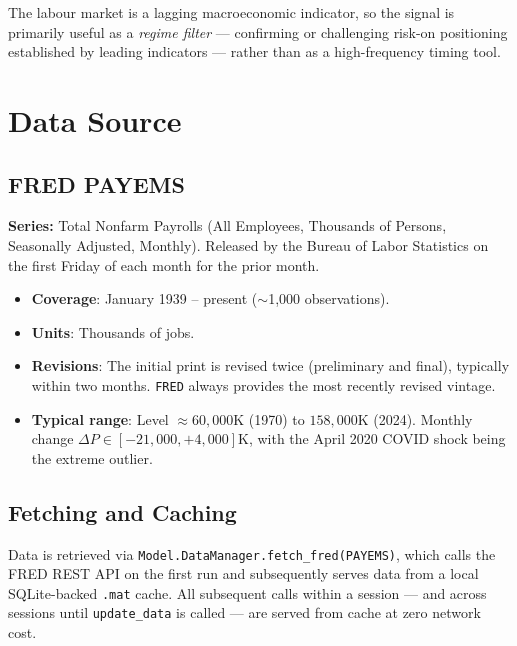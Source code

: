 \documentclass[11pt, a4paper]{article}
\newcommand{\dP}{\Delta P}
\begin{document}
The labour market is a lagging macroeconomic indicator, so the signal
is primarily useful as a \emph{regime filter} — confirming or
challenging risk-on positioning established by leading indicators —
rather than as a high-frequency timing tool.

\section{Data Source}
\label{sec:data}

\subsection{FRED PAYEMS}

\textbf{Series:} Total Nonfarm Payrolls (All Employees, Thousands of
Persons, Seasonally Adjusted, Monthly). Released by the Bureau of
Labor Statistics on the first Friday of each month for the prior month.

\begin{itemize}[leftmargin=2em]
  \item \textbf{Coverage}: January 1939 -- present ($\sim$1{,}000 observations).
  \item \textbf{Units}: Thousands of jobs.
  \item \textbf{Revisions}: The initial print is revised twice (preliminary
        and final), typically within two months. \texttt{FRED} always
        provides the most recently revised vintage.
  \item \textbf{Typical range}: Level $\approx 60{,}000$K (1970) to
        $158{,}000$K (2024). Monthly change $\dP \in [-21{,}000, +4{,}000]$K,
        with the April 2020 COVID shock being the extreme outlier.
\end{itemize}

\subsection{Fetching and Caching}

Data is retrieved via \texttt{Model.DataManager.fetch\_fred(\textquotesingle PAYEMS\textquotesingle)},
which calls the FRED REST API on the first run and subsequently serves
data from a local SQLite-backed \texttt{.mat} cache. All subsequent
calls within a session — and across sessions until \texttt{update\_data}
is called — are served from cache at zero network cost.

\end{document}
